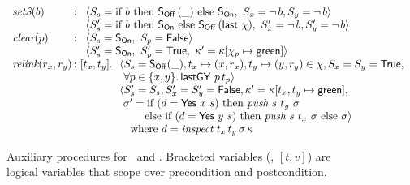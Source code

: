 {\begin{figure}[t]
%
\small
\[
\begin{array}{l@{\, :\ }l}
  \aux{setS}(b) &
  \begin{array}[t]{l}
        \langle \sss = \textrm{if}\ b\ \textrm{then}\ \sOff\,(\_) \ 
        \textrm{else}\ \sOn,\ \sx = \neg\, b, \sy = \neg\, b \rangle\\
        \langle \sss' = \textrm{if}\ b\ \textrm{then}\ \sOn\ %
        \textrm{else}\ \sOff\,(\mathsf{last}\ \hist),\
         \sx' = \neg\, b, \sy' = \neg\, b \rangle
\end{array}\\[2.5pt] 
   \aux{clear}(p) &
  \begin{array}[t]{l}
   \langle\sss = \sOn,\ \spp = \FF \rangle\\
   \langle\sss' = \sOn,\ \spp' = \TT,\
     \CP = \C[\histp \hpts \mathsf{green}] \rangle
  \end{array}\\[2.5pt]
   \aux{relink}(r_x, r_y) & [t_x, t_y]\ldot
    \begin{array}[t]{l}
    \langle\sss = \sOff(\_), %
      t_x \hpts (x, r_x), t_y \hpts (y, r_y) \in \hist, \sx = \sy = \TT, \\
     \hphantom{\langle} \forall p \in \{x,y\}\ldot \lgVy\ p\, t_p \rangle\\
        \langle\sss' = \sss, \sx'= \sy'=\FF,%
        \CP = \C[t_x, t_y \hpts \mathsf{green}],\\
      \ \ordlist' = \textrm{if}\ (d = \mathsf{Yes}\ x\ s)\
                \textrm{then}\ \aux{push}\ s\ t_y\ \ordlist\\
                 \phantom{\ \ordlist =\ } \textrm{else\ if}\
                 (d = \mathsf{Yes}\ y\ s)\ \textrm{then}\
                 \aux{push}\ s\ t_x\ \ordlist\ \textrm{else}\ \ordlist\rangle\\
  \quad \mbox{where $d = \aux{inspect}\ t_x\, t_y\, \ordlist\, \C$}
  \end{array}
\end{array}
\]
\caption{\label{fig:auxcode} Auxiliary procedures for
\jywrite~and 
  \jyscan. Bracketed variables (\eg, $[t, v]$) are logical variables
  that scope over precondition and postcondition.}
\end{figure}
}

